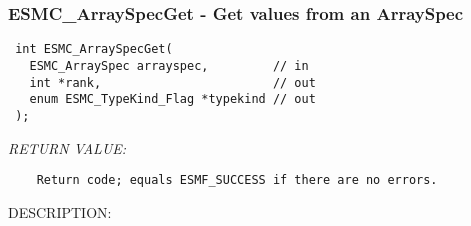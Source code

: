  
\setlength{\oldparskip}{\parskip}
\setlength{\parskip}{1.5ex}
\setlength{\oldparindent}{\parindent}
\setlength{\parindent}{0pt}
\setlength{\oldbaselineskip}{\baselineskip}
\setlength{\baselineskip}{11pt}
 
\def\bv{\begin{verbatim}}
\def\ev{\end{verbatim}}
\def\be{\begin{equation}}
\def\ee{\end{equation}}
\def\bea{\begin{eqnarray}}
\def\eea{\end{eqnarray}}
\def\bi{\begin{itemize}}
\def\ei{\end{itemize}}
\def\bn{\begin{enumerate}}
\def\en{\end{enumerate}}
\def\bd{\begin{description}}
\def\ed{\end{description}}
\def\({\left (}
\def\){\right )}
\def\[{\left [}
\def\]{\right ]}
\def\<{\left  \langle}
\def\>{\right \rangle}
\def\cI{{\cal I}}
\def\diag{\mathop{\rm diag}}
\def\tr{\mathop{\rm tr}}


 
\subsubsection [ESMC\_ArraySpecGet] {ESMC\_ArraySpecGet - Get values from an ArraySpec}


  
\begin{verbatim} int ESMC_ArraySpecGet(
   ESMC_ArraySpec arrayspec,         // in
   int *rank,                        // out
   enum ESMC_TypeKind_Flag *typekind // out
 );\end{verbatim}{\em RETURN VALUE:}
\begin{verbatim}    Return code; equals ESMF_SUCCESS if there are no errors.\end{verbatim}
{\sf DESCRIPTION:\\ }


